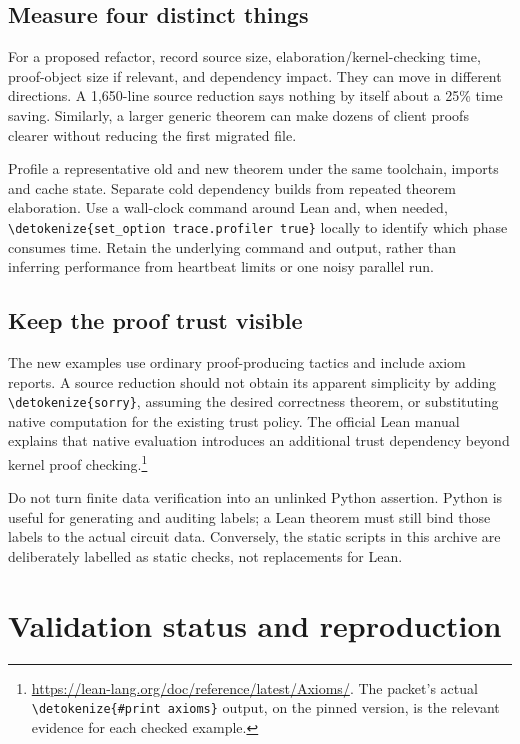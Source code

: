 \documentclass[11pt,letterpaper]{article}
\newcommand{\code}[1]{\expandafter\nolinkurl\expandafter{\detokenize{#1}}}
\begin{document}
\subsection{Measure four distinct things}

For a proposed refactor, record source size, elaboration/kernel-checking time, proof-object size if relevant, and dependency impact. They can move in different directions. A 1,650-line source reduction says nothing by itself about a 25\% time saving. Similarly, a larger generic theorem can make dozens of client proofs clearer without reducing the first migrated file.

Profile a representative old and new theorem under the same toolchain, imports and cache state. Separate cold dependency builds from repeated theorem elaboration. Use a wall-clock command around Lean and, when needed, \code{set_option trace.profiler true} locally to identify which phase consumes time. Retain the underlying command and output, rather than inferring performance from heartbeat limits or one noisy parallel run.

\subsection{Keep the proof trust visible}

The new examples use ordinary proof-producing tactics and include axiom reports. A source reduction should not obtain its apparent simplicity by adding \code{sorry}, assuming the desired correctness theorem, or substituting native computation for the existing trust policy. The official Lean manual explains that native evaluation introduces an additional trust dependency beyond kernel proof checking.\footnote{\url{https://lean-lang.org/doc/reference/latest/Axioms/}. The packet's actual \code{#print axioms} output, on the pinned version, is the relevant evidence for each checked example.}

Do not turn finite data verification into an unlinked Python assertion. Python is useful for generating and auditing labels; a Lean theorem must still bind those labels to the actual circuit data. Conversely, the static scripts in this archive are deliberately labelled as static checks, not replacements for Lean.

\section{Validation status and reproduction}
\end{document}
